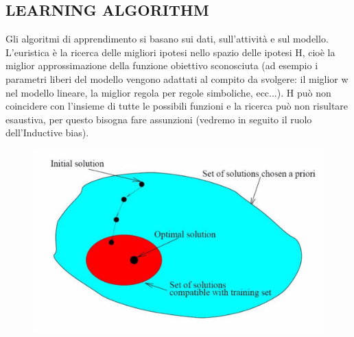 \documentclass{article}
\begin{document}
\subsection{LEARNING ALGORITHM}
Gli algoritmi di apprendimento si basano sui dati, sull'attività e sul modello. L'euristica è la ricerca delle migliori ipotesi nello spazio delle ipotesi H, cioè la miglior approssimazione della funzione obiettivo sconosciuta (ad esempio i parametri liberi del modello vengono adattati al compito da svolgere: il miglior w nel modello lineare, la miglior regola per regole simboliche, ecc...). H può non coincidere con l'insieme di tutte le possibili funzioni e la ricerca può non risultare esaustiva, per questo bisogna fare assunzioni (vedremo in seguito il ruolo dell'Inductive bias).
\begin{figure}[H]
    \centering
    \includegraphics[scale=0.5]{Images/learningalgo.png}
\end{figure}
\end{document}
